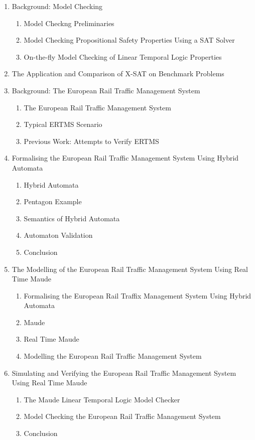 \documentclass{article}
\begin{document}
\begin{enumerate}
\begin{enumerate}[label*=\arabic*.]
\end{enumerate}
\item Background: Model Checking 
\begin{enumerate}[label*=\arabic*.]
\item Model Checkng Preliminaries 
\item Model Checking Propositional Safety Properties Using a SAT Solver
\item On-the-fly Model Checking of Linear Temporal Logic Properties 
\end{enumerate}
\item The Application and Comparison of X-SAT on Benchmark Problems 
\item Background: The European Rail Traffic Management System 
\begin{enumerate}[label*=\arabic*.]
\item The European Rail Traffic Management System 
\item Typical ERTMS Scenario
\item Previous Work: Attempts to Verify ERTMS
\end{enumerate}
\item Formalising the European Rail Traffic Management System Using Hybrid
Automata 
\begin{enumerate}[label*=\arabic*.]
\item Hybrid Automata 
\item Pentagon Example 
\item Semantics of Hybrid Automata
\item Automaton Validation 
\item Conclusion 
\end{enumerate}
\item The Modelling of the European Rail Traffic Management System Using
Real Time Maude 
\begin{enumerate}[label*=\arabic*.]
\item Formalising the European Rail Traffix Management System Using Hybrid Automata 
\item Maude 
\item Real Time Maude 
\item Modelling the European Rail Traffic Management System 
\end{enumerate}
\item Simulating and Verifying the European Rail Traffic Management System
Using Real Time Maude
\begin{enumerate}[label*=\arabic*.]
\item The Maude Linear Temporal Logic Model Checker 
\item Model Checking the European Rail Traffic Management System 
\item Conclusion
\end{enumerate}
\end{enumerate}
\end{document}
